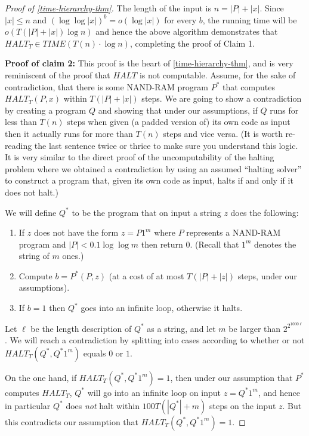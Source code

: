 \begin{proof}[Proof of \cref{time-hierarchy-thm}]
The length of the input is \(n=|P|+|x|\). Since \(|x| \leq n\) and
\((\log \log |x|)^b = o(\log |x|)\) for every \(b\), the running time
will be \(o(T(|P|+|x|) \log n)\) and hence the above algorithm
demonstrates that
\(\ensuremath{\mathit{HALT}}_T \in \ensuremath{\mathit{TIME}}(T(n)\cdot \log n)\),
completing the proof of Claim 1.

\textbf{Proof of claim 2:} This proof is the heart of
\cref{time-hierarchy-thm}, and is very reminiscent of the proof that
\(\ensuremath{\mathit{HALT}}\) is not computable. Assume, for the sake
of contradiction, that there is some NAND-RAM program \(P^*\) that
computes \(\ensuremath{\mathit{HALT}}_T(P,x)\) within \(T(|P|+|x|)\)
steps. We are going to show a contradiction by creating a program \(Q\)
and showing that under our assumptions, if \(Q\) runs for less than
\(T(n)\) steps when given (a padded version of) its own code as input
then it actually runs for more than \(T(n)\) steps and vice versa. (It
is worth re-reading the last sentence twice or thrice to make sure you
understand this logic. It is very similar to the direct proof of the
uncomputability of the halting problem where we obtained a contradiction
by using an assumed ``halting solver'' to construct a program that,
given its own code as input, halts if and only if it does not halt.)

We will define \(Q^*\) to be the program that on input a string \(z\)
does the following:

\begin{enumerate}
\def\labelenumi{\arabic{enumi}.}
\item
  If \(z\) does not have the form \(z=P1^m\) where \(P\) represents a
  NAND-RAM program and \(|P|< 0.1 \log\log m\) then return \(0\).
  (Recall that \(1^m\) denotes the string of \(m\) ones.)
\item
  Compute \(b= P^*(P,z)\) (at a cost of at most \(T(|P|+|z|)\) steps,
  under our assumptions).
\item
  If \(b=1\) then \(Q^*\) goes into an infinite loop, otherwise it
  halts.
\end{enumerate}

Let \(\ell\) be the length description of \(Q^*\) as a string, and let
\(m\) be larger than \(2^{2^{1000 \ell}}\). We will reach a
contradiction by splitting into cases according to whether or not
\(\ensuremath{\mathit{HALT}}_T(Q^*,Q^*1^m)\) equals \(0\) or \(1\).

On the one hand, if \(\ensuremath{\mathit{HALT}}_T(Q^*,Q^*1^m)=1\), then
under our assumption that \(P^*\) computes
\(\ensuremath{\mathit{HALT}}_T\), \(Q^*\) will go into an infinite loop
on input \(z=Q^*1^m\), and hence in particular \(Q^*\) does \emph{not}
halt within \(100 T(|Q^*|+m)\) steps on the input \(z\). But this
contradicts our assumption that
\(\ensuremath{\mathit{HALT}}_T(Q^*,Q^*1^m)=1\).


\end{proof}
